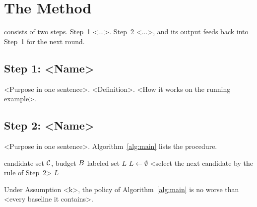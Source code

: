 \section{The \sys{} Method}
\label{sec:method}
\sys{} consists of two steps. Step~1 <...>. Step~2 <...>, and its output feeds back into Step~1 for the next round.

\subsection{Step 1: <Name>}
\label{sec:step1}
<Purpose in one sentence>. <Definition>. <How it works on the running example>.

\subsection{Step 2: <Name>}
\label{sec:step2}
<Purpose in one sentence>. Algorithm~\ref{alg:main} lists the procedure.

\begin{algorithm}[t]
\caption{<Name of the procedure>}
\label{alg:main}
\begin{algorithmic}[1]
\REQUIRE candidate set $\mathcal{C}$, budget $B$
\ENSURE labeled set $L$
\STATE $L \gets \emptyset$
  \STATE <select the next candidate by the rule of Step~2>
\ENDWHILE
\RETURN $L$
\end{algorithmic}
\end{algorithm}

\begin{theorem}[Guarantee]
\label{thm:guarantee}
Under Assumption <k>, the policy of Algorithm~\ref{alg:main} is no worse than <every baseline it contains>.
\end{theorem}
